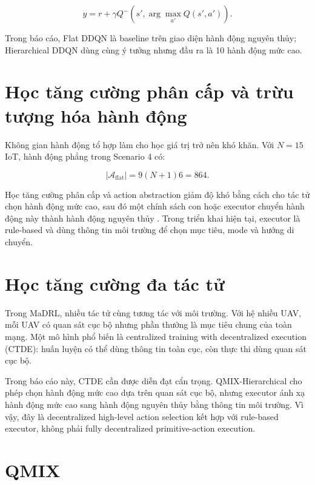 \begin{equation}
y=r+\gamma Q^{-}\left(s',\arg\max_{a'} Q(s',a')\right).
\label{eq:background_ddqn}
\end{equation}

Trong báo cáo, Flat DDQN là baseline trên giao diện hành động nguyên thủy; Hierarchical DDQN dùng cùng ý tưởng nhưng đầu ra là 10 hành động mức cao.

\section{Học tăng cường phân cấp và trừu tượng hóa hành động}

Không gian hành động tổ hợp làm cho học giá trị trở nên khó khăn. Với \(N=15\) IoT, hành động phẳng trong Scenario 4 có:

\begin{equation}
|\mathcal{A}_{\mathrm{flat}}|=9(N+1)6=864.
\label{eq:background_flat_dim}
\end{equation}

Học tăng cường phân cấp và action abstraction giảm độ khó bằng cách cho tác tử chọn hành động mức cao, sau đó một chính sách con hoặc executor chuyển hành động này thành hành động nguyên thủy \cite{hierarchical_rl_todo}. Trong triển khai hiện tại, executor là rule-based và dùng thông tin môi trường để chọn mục tiêu, mode và hướng di chuyển.

\section{Học tăng cường đa tác tử}

Trong MaDRL, nhiều tác tử cùng tương tác với môi trường. Với hệ nhiều UAV, mỗi UAV có quan sát cục bộ nhưng phần thưởng là mục tiêu chung của toàn mạng. Một mô hình phổ biến là centralized training with decentralized execution (CTDE): huấn luyện có thể dùng thông tin toàn cục, còn thực thi dùng quan sát cục bộ.

Trong báo cáo này, CTDE cần được diễn đạt cẩn trọng. QMIX-Hierarchical cho phép chọn hành động mức cao dựa trên quan sát cục bộ, nhưng executor ánh xạ hành động mức cao sang hành động nguyên thủy bằng thông tin môi trường. Vì vậy, đây là decentralized high-level action selection kết hợp với rule-based executor, không phải fully decentralized primitive-action execution.

\section{QMIX}

